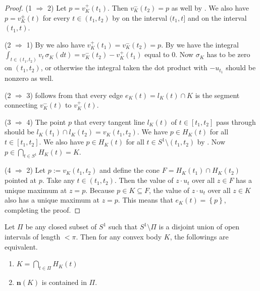 \begin{proof}
(1 \(\Rightarrow\) 2) Let \(p = v_K^+(t_1)\). Then \(v_K^-(t_2) = p\) as well by . We also have \(p = v_K^{\pm}(t)\) for every \(t \in (t_1, t_2)\) by  on the interval \((t_1, t]\) and  on the interval \((t_1, t)\).

(2 \(\Rightarrow\) 1) By  we also have \(v_K^+(t_1) = v_K^-(t_2) = p\). By  we have the integral \(\int_{t \in (t_1, t_2)} v_t \, \sigma_K(dt) = v_K^-(t_2) - v_K^+(t_1)\) equal to \(0\). Now \(\sigma_K\) has to be zero on \((t_1, t_2)\), or otherwise the integral taken the dot product with \(-u_{t_1}\) should be nonzero as well.

(2 \(\Rightarrow\) 3) follows from that every edge \(e_K(t) = l_K(t) \cap K\) is the segment connecting \(v_K^-(t)\) to \(v_K^+(t)\).

(3 \(\Rightarrow\) 4) The point \(p\) that every tangent line \(l_K(t)\) of \(t \in [t_1, t_2]\) pass through should be \(l_K(t_1) \cap l_K(t_2) = v_K(t_1, t_2)\). We have \(p \in H_K(t)\) for all \(t \in [t_1, t_2]\). We also have \(p \in H_K(t)\) for all \(t \in S^1 \setminus (t_1, t_2)\) by . Now \(p \in \bigcap_{t \in S^1} H_K(t) = K\).

(4 \(\Rightarrow\) 2) Let \(p := v_K(t_1, t_2)\) and define the cone \(F = H_K(t_1) \cap H_K(t_2)\) pointed at \(p\). Take any \(t \in (t_1, t_2)\). Then the value of \(z \cdot u_t\) over all \(z \in F\) has a unique maximum at \(z = p\). Because \(p \in K \subseteq F\), the value of \(z \cdot u_t\) over all \(z \in K\) also has a unique maximum at \(z = p\). This means that \(e_K(t) = \left\{ p \right\}\), completing the proof.
\end{proof}

\begin{theorem}

Let \(\Pi\) be any closed subset of \(S^1\) such that \(S^1 \setminus \Pi\) is a disjoint union of open intervals of length \(< \pi\). Then for any convex body \(K\), the followings are equivalent.

\begin{enumerate}
\def\labelenumi{\arabic{enumi}.}
\tightlist
\item
  \(K = \bigcap_{t \in \Pi} H_K(t)\)
\item
  \(\mathbf{n}(K)\) is contained in \(\Pi\).
\end{enumerate}

\label{thm:convex-set-support}
\end{theorem}

